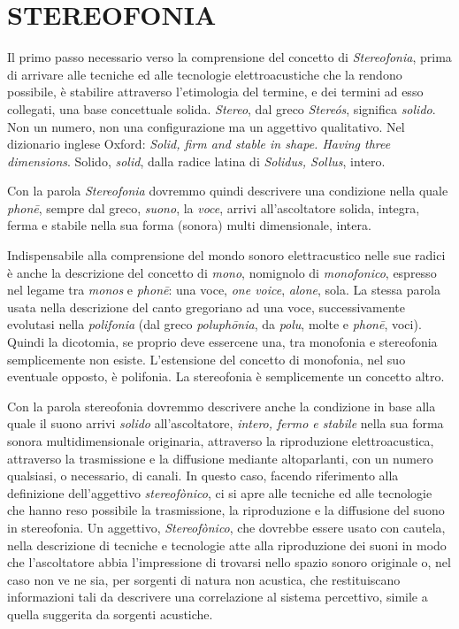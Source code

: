 
\chapter{STEREOFONIA}
\startcontents[chapters]

\vfill\null

Il primo passo necessario verso la comprensione del concetto di \emph{Stereofonia},
prima di arrivare alle tecniche ed alle tecnologie elettroacustiche che la
rendono possibile, è stabilire attraverso l'etimologia del termine, e dei
termini ad esso collegati, una base concettuale solida. \emph{Stereo}, dal greco
\emph{Stere\'os}, significa \emph{solido}. Non un numero, non una configurazione
ma un aggettivo qualitativo. Nel dizionario inglese Oxford: \emph{Solid, firm
and stable in shape. Having three dimensions}. Solido, \emph{solid}, dalla radice
latina di \emph{Solidus, Sollus}, intero.

Con la parola \emph{Stereofonia} dovremmo quindi descrivere una condizione
nella quale \emph{phon\={e}}, sempre dal greco, \emph{suono}, la \emph{voce},
arrivi all'ascoltatore solida, integra, ferma e stabile nella sua forma (sonora)
multi dimensionale, intera.


Indispensabile alla comprensione del mondo sonoro elettracustico nelle sue
radici è anche la descrizione del concetto di \emph{mono}, nomignolo di
\emph{monofonico}, espresso nel legame tra \emph{monos} e \emph{phon\={e}}: una voce,
\emph{one voice}, \emph{alone}, sola. La stessa parola usata nella descrizione
del canto gregoriano ad una voce, successivamente evolutasi nella \emph{polifonia}
(dal greco \emph{poluph\={o}nia}, da \emph{polu}, molte e \emph{phon\={e}},
voci). Quindi la dicotomia, se proprio deve essercene una, tra monofonia e
stereofonia semplicemente non esiste. L'estensione del concetto di monofonia,
nel suo eventuale opposto, è polifonia. La stereofonia è semplicemente un
concetto altro.

Con la parola stereofonia dovremmo descrivere anche la condizione in base alla
quale il suono arrivi \emph{solido} all'ascoltatore, \emph{intero, fermo e
stabile} nella sua forma sonora multidimensionale originaria, attraverso
la riproduzione elettroacustica, attraverso la trasmissione e la diffusione mediante
altoparlanti, con un numero qualsiasi, o necessario, di canali. In questo caso,
facendo riferimento alla definizione dell'aggettivo \emph{stereofònico}, ci
si apre alle tecniche ed alle tecnologie che hanno reso possibile la
trasmissione, la riproduzione e la diffusione del suono in stereofonia.
Un aggettivo, \emph{Stereofònico}, che dovrebbe essere usato con cautela, nella
descrizione di tecniche e tecnologie atte alla riproduzione dei suoni in modo
che l’ascoltatore abbia l’impressione di trovarsi nello spazio sonoro originale o,
nel caso non ve ne sia, per sorgenti di natura non acustica, che restituiscano
informazioni tali da descrivere una correlazione al sistema percettivo, simile a
quella suggerita da sorgenti acustiche.

